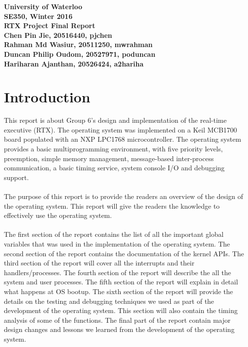 \documentclass[12pt]{article}
\begin{document}
\begin{center}
{\Large\bf University of Waterloo}\\
\vspace{3mm}
{\Large\bf SE350, Winter 2016}\\
\vspace{80mm}
{\Large\bf RTX Project Final Report}\\
\vspace{80mm}
\textbf{Chen Pin Jie, 20516440, pjchen} \\
\textbf{Rahman Md Wasiur, 20511250, mwrahman} \\
\textbf{Duncan Philip Oudom, 20527971,  poduncan} \\
\textbf{Hariharan Ajanthan, 20526424, a2hariha} \\

\end{center}

\def\question#1{\item[\bf #1.]}
\def\part#1{\item[\bf #1)]}
\newcommand{\pc}[1]{\mbox{\textbf{#1}}} %

\clearpage
\tableofcontents
\newpage
\section{Introduction}
This report is about Group 6’s design and implementation of the real-time executive (RTX). The operating system was implemented on a Keil MCB1700 board populated with an NXP LPC1768 microcontroller. The operating system provides a basic multiprogramming environment, with five priority levels, preemption, simple memory management, message-based inter-process communication, a basic timing service, system console I/O and debugging support.\\ \\
The purpose of this report is to provide the readers an overview of the design of the operating system. This report will give the readers the knowledge to effectively use the operating system. \\ \\
The first section of the report contains the list of all the important global variables that was used in the implementation of the operating system. The second section of the report contains the documentation of the kernel APIs. The third section of the report will cover all the interrupts and their handlers/processes. The fourth section of the report will describe the all the system and user processes. The fifth section of the report will explain in detail what happens at OS bootup. The sixth section of the report will provide the details on the testing and debugging techniques we used as part of the development of the operating system. This section will also contain the timing analysis of some of the functions. The final part of the report contain major design changes and lessons we learned from the development of the operating system.
\newpage
\end{document}
